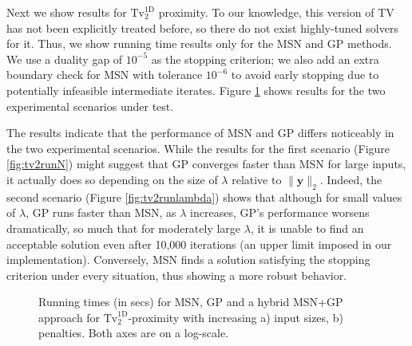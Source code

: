 \documentclass[twoside,11pt]{article}
\newcommand{\vy}{\bm{y}}       \newcommand{\vyh}{\hat{\bm{y}}}        \newcommand{\yh}{\hat{y}}    \newcommand{\vyt}{\tilde{\bm{y}}}       \newcommand{\yt}{\tilde{y}}
\newcommand{\mynorm}[2]{\| {#1} \|_{#2}}
\newcommand{\enorm}[1]{\mynorm{#1}{2}}
\newcommand{\tvell}{\text{Tv}}
\newcommand{\oned}{\text{1D}}
\numberwithin{equation}{section}
\numberwithin{theorem}{section}
\begin{document}
Next we show results for $\tvell_2^{\oned}$ proximity. To our knowledge, this version of TV has not been explicitly treated before, so there do not exist highly-tuned solvers for it. Thus, we show running time results only for the MSN and GP methods. We use a duality gap of $10^{-5}$ as the stopping criterion; we also add an extra boundary check for MSN with tolerance $10^{-6}$ to avoid early stopping due to potentially infeasible intermediate iterates. Figure \ref{fig:tv2run} shows results for the two experimental scenarios under test.

The results indicate that the performance of MSN and GP differs noticeably in the two experimental scenarios. While the results for the first scenario (Figure \ref{fig:tv2runN}) might suggest that GP converges faster than MSN for large inputs, it actually does so depending on the size of $\lambda$ relative to $\enorm{\vy}$. Indeed, the second scenario (Figure \ref{fig:tv2runlambda}) shows that although for small values of $\lambda$, GP runs faster than MSN, as $\lambda$ increases, GP's performance worsens dramatically, so much that for moderately large $\lambda$, it is unable to find an acceptable solution even after 10,000 iterations (an upper limit imposed in our implementation). Conversely, MSN finds a solution satisfying the stopping criterion under every situation, thus showing a more robust behavior.

\begin{figure}[t]
  \centering
  \caption{Running times (in secs) for MSN, GP and a hybrid MSN+GP approach for $\tvell_2^{\oned}$-proximity with increasing a) input sizes, b) penalties. Both axes are on a log-scale.
   \label{fig:tv2run}
   }
\end{figure}
\end{document}
